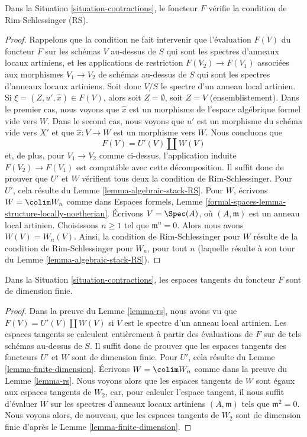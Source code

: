 \begin{lemma}
\label{lemma-rs}
Dans la Situation \ref{situation-contractions}, le foncteur $F$ vérifie
la condition de Rim-Schlessinger (RS).
\end{lemma}

\begin{proof}
Rappelons que la condition ne fait intervenir que l'évaluation $F(V)$ du foncteur
$F$ sur les schémas $V$ au-dessus de $S$ qui sont les spectres d'anneaux locaux artiniens,
et les applications de restriction $F(V_2) \to F(V_1)$ associées aux morphismes $V_1 \to V_2$
de schémas au-dessus de $S$ qui sont les spectres d'anneaux locaux artiniens.
Soit donc $V/S$ le spectre d'un anneau local artinien.
Si $\xi = (Z, u', \hat x) \in F(V)$, alors soit $Z = \emptyset$,
soit $Z = V$ (ensemblistement). Dans le premier cas, nous voyons que
$\hat x$ est un morphisme de l'espace algébrique formel vide
vers $W$. Dans le second cas, nous voyons que $u'$ est un morphisme du
schéma vide vers $X'$ et que $\hat x : V \to W$
est un morphisme vers $W$. Nous concluons que
$$
F(V) = U'(V) \amalg W(V)
$$
et, de plus, pour $V_1 \to V_2$ comme ci-dessus, l'application induite
$F(V_2) \to F(V_1)$ est compatible avec cette décomposition.
Il suffit donc de prouver que $U'$ et $W$ vérifient tous deux la
condition de Rim-Schlessinger. Pour $U'$, cela résulte du
Lemme \ref{lemma-algebraic-stack-RS}.
Pour $W$, écrivons $W = \colim W_n$ comme dans
Espaces formels, Lemme
\ref{formal-spaces-lemma-structure-locally-noetherian}.
Écrivons $V = \Spec(A)$, où $(A, \mathfrak m)$ est un anneau local artinien.
Choisissons $n \geq 1$ tel que $\mathfrak m^n = 0$. Alors nous avons
$W(V) = W_n(V)$. Ainsi, la condition de Rim-Schlessinger
pour $W$ résulte de la condition de Rim-Schlessinger pour $W_n$, pour
tout $n$ (laquelle résulte à son tour du
Lemme \ref{lemma-algebraic-stack-RS}).
\end{proof}

\begin{lemma}
\label{lemma-finite-dim}
Dans la Situation \ref{situation-contractions}, les espaces tangents du
foncteur $F$ sont de dimension finie.
\end{lemma}

\begin{proof}
Dans la preuve du Lemme \ref{lemma-rs}, nous avons vu que
$F(V) = U'(V) \amalg W(V)$ si $V$ est le spectre d'un anneau
local artinien. Les espaces tangents se calculent entièrement à partir des évaluations
de $F$ sur de tels schémas au-dessus de $S$.
Il suffit donc de prouver que les espaces tangents
des foncteurs $U'$ et $W$ sont de dimension finie.
Pour $U'$, cela résulte du
Lemme \ref{lemma-finite-dimension}.
Écrivons $W = \colim W_n$ comme dans la preuve du Lemme \ref{lemma-rs}.
Nous voyons alors que les espaces tangents de $W$ sont égaux aux
espaces tangents de $W_2$, car, pour calculer l'espace tangent,
il nous suffit d'évaluer $W$ sur les spectres d'anneaux locaux
artiniens $(A, \mathfrak m)$ tels que $\mathfrak m^2 = 0$.
Nous voyons alors, de nouveau, que les espaces tangents de $W_2$ sont
de dimension finie d'après le
Lemme \ref{lemma-finite-dimension}.
\end{proof}


